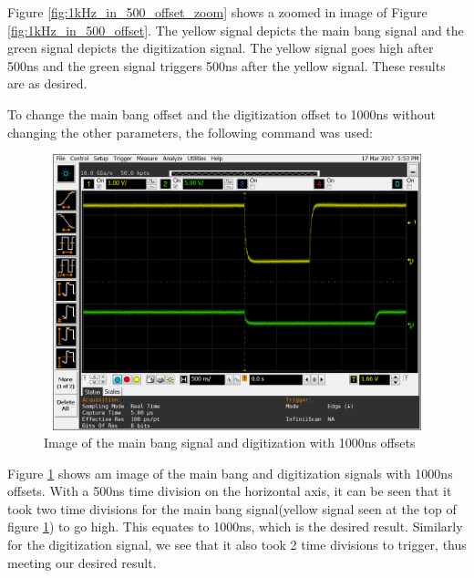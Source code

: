 \documentclass[12pt, a4paper]{article}
\begin{document}
	
Figure \ref{fig:1kHz_in_500_offset_zoom} shows a zoomed in image of Figure \ref{fig:1kHz_in_500_offset}. The yellow signal depicts the main bang signal and the green signal depicts the digitization signal. The yellow signal goes high after 500ns and the green signal triggers 500ns after the yellow signal. These results are as desired. 

To change the main bang offset and the digitization offset to \hypertarget{1000ns_offset}{1000ns} without changing the other parameters, the following command was used:


	
	\begin{figure}[t]
		\centering
		\includegraphics[width=13cm, height=8cm]{1khz_mb_offset_1000_ns_length_of_offset}
		\caption{Image of the main bang signal and digitization with 1000ns offsets}
		\label{fig:1kHz_in_1000_offset}
	\end{figure}
	

Figure \ref{fig:1kHz_in_1000_offset} shows am image of the main bang and digitization signals with 1000ns offsets. With a 500ns time division on the horizontal axis, it can be seen that it took two time divisions for the main bang signal(yellow signal seen at the top of figure \ref{fig:1kHz_in_1000_offset}) to go high. This equates to 1000ns, which is the desired result. Similarly for the digitization signal, we see that it also took 2 time divisions to trigger, thus meeting our desired result. 
\end{document}
